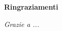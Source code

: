 \thispagestyle{empty}

\begin{center}
  {\bf \Huge Ringraziamenti}
\end{center}

\vspace{4cm}
\emph{Grazie a ...}
